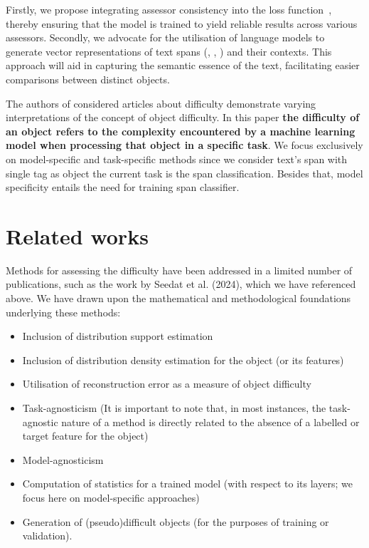 \documentclass{article}
\begin{document}
Firstly, we propose integrating assessor consistency into the loss function~\cite{le2023learning}, thereby ensuring that the model is trained to yield reliable results across various assessors. Secondly, we advocate for the utilisation of language models to generate vector representations of text spans (\cite{joshi2020spanbert}, \cite{eberts2020span}, \cite{toshniwal2020cross}) and their contexts. This approach will aid in capturing the semantic essence of the text, facilitating easier comparisons between distinct objects.

The authors of considered articles about difficulty demonstrate varying interpretations of the concept of object difficulty. In this paper \textbf{the difficulty of an object refers to the complexity encountered by a machine learning model when processing that object in a specific task}. We focus exclusively on model-specific and task-specific methods since we consider text's span with single tag as object the current task is the span classification. Besides that, model specificity entails the need for training span classifier.

\section{Related works}
Methods for assessing the difficulty have been addressed in a limited number of publications, such as the work by Seedat et al. (2024), which we have referenced above. We have drawn upon the mathematical and methodological foundations underlying these methods:

\begin{itemize}
    \item Inclusion of distribution support estimation
    \item Inclusion of distribution density estimation for the object (or its features)
    \item Utilisation of reconstruction error as a measure of object difficulty
    \item Task-agnosticism (It is important to note that, in most instances, the task-agnostic nature of a method is directly related to the absence of a labelled or target feature for the object)
    \item Model-agnosticism
    \item Computation of statistics for a trained model (with respect to its layers; we focus here on model-specific approaches)
    \item Generation of (pseudo)difficult objects (for the purposes of training or validation).
\end{itemize}
\end{document}
